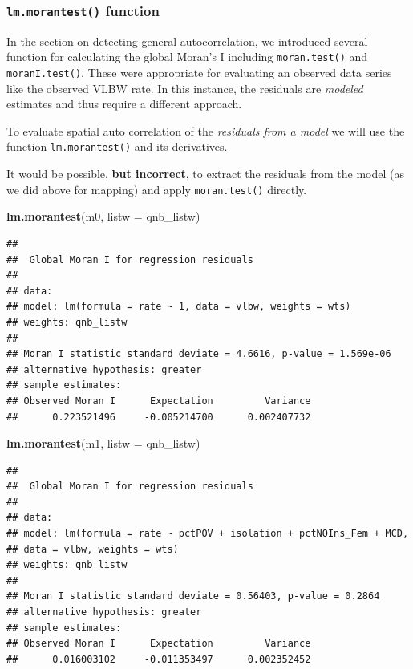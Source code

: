 \documentclass[
]{book}
\newenvironment{Shaded}{\begin{snugshade}}{\end{snugshade}}
\newcommand{\AttributeTok}[1]{\textcolor[rgb]{0.13,0.29,0.53}{#1}}
\newcommand{\FunctionTok}[1]{\textcolor[rgb]{0.13,0.29,0.53}{\textbf{#1}}}
\newcommand{\NormalTok}[1]{#1}
\newenvironment{rmdcaution}[1]
  {
  \begin{itemize}
  \renewcommand{\labelitemi}{
    \raisebox{-.7\height}[0pt][0pt]{
      {\setkeys{Gin}{width=3em,keepaspectratio}\texttt{[image: images/\#1]}}
    }
  }
  \setlength{\fboxsep}{1em}
  \begin{caution}
  \item
  }
  {
  \end{caution}
  \end{itemize}
  }
\begin{document}
\hypertarget{lm.morantest-function}{%
\subsubsection{\texorpdfstring{\texttt{lm.morantest()} function}{lm.morantest() function}}\label{lm.morantest-function}}

In the section on detecting general autocorrelation, we introduced several function for calculating the global Moran's I including \texttt{moran.test()} and \texttt{moranI.test()}. These were appropriate for evaluating an observed data series like the observed VLBW rate. In this instance, the residuals are \emph{modeled} estimates and thus require a different approach.

To evaluate spatial auto correlation of the \emph{residuals from a model} we will use the function \texttt{lm.morantest()} and its derivatives.

\begin{rmdcaution}{caution}
It would be possible, \textbf{but incorrect}, to extract the residuals from the model (as we did above for mapping) and apply \texttt{moran.test()} directly.

\end{rmdcaution}

\begin{Shaded}
\begin{Highlighting}[]
\FunctionTok{lm.morantest}\NormalTok{(m0, }\AttributeTok{listw =}\NormalTok{ qnb\_listw)}
\end{Highlighting}
\end{Shaded}

\begin{verbatim}
## 
##  Global Moran I for regression residuals
## 
## data:  
## model: lm(formula = rate ~ 1, data = vlbw, weights = wts)
## weights: qnb_listw
## 
## Moran I statistic standard deviate = 4.6616, p-value = 1.569e-06
## alternative hypothesis: greater
## sample estimates:
## Observed Moran I      Expectation         Variance 
##      0.223521496     -0.005214700      0.002407732
\end{verbatim}

\begin{Shaded}
\begin{Highlighting}[]
\FunctionTok{lm.morantest}\NormalTok{(m1, }\AttributeTok{listw =}\NormalTok{ qnb\_listw)}
\end{Highlighting}
\end{Shaded}

\begin{verbatim}
## 
##  Global Moran I for regression residuals
## 
## data:  
## model: lm(formula = rate ~ pctPOV + isolation + pctNOIns_Fem + MCD,
## data = vlbw, weights = wts)
## weights: qnb_listw
## 
## Moran I statistic standard deviate = 0.56403, p-value = 0.2864
## alternative hypothesis: greater
## sample estimates:
## Observed Moran I      Expectation         Variance 
##      0.016003102     -0.011353497      0.002352452
\end{verbatim}
\end{document}
